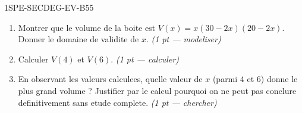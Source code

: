 \begin{evaluation}{1SPE-SECDEG-EV-B}{55}
\begin{enumerate}
  \item Montrer que le volume de la boite est $V(x) = x(30-2x)(20-2x)$.
  Donner le domaine de validite de $x$.
  \hfill\textit{(1 pt — modeliser)}

  \item Calculer $V(4)$ et $V(6)$.
  \hfill\textit{(1 pt — calculer)}

  \item En observant les valeurs calculees, quelle valeur de $x$ (parmi $4$ et $6$) donne le plus grand volume ?
  Justifier par le calcul pourquoi on ne peut pas conclure definitivement sans etude complete.
  \hfill\textit{(1 pt — chercher)}
\end{enumerate}

\end{evaluation}
